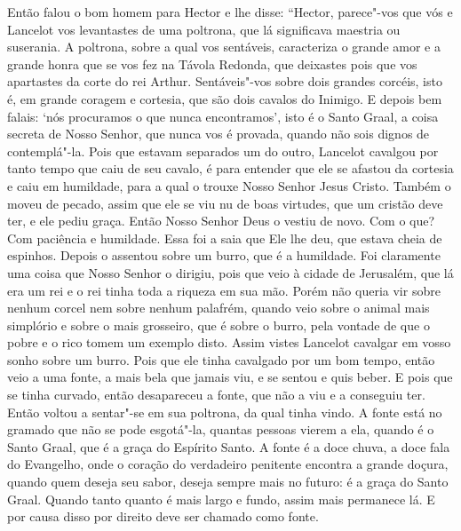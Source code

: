 Então falou o bom homem para Hector e lhe disse: “Hector, parece"-vos que vós e
Lancelot vos levantastes de uma poltrona, que lá significava maestria ou
suserania. A poltrona, sobre a qual vos sentáveis, caracteriza o grande amor e
a grande honra que se vos fez na Távola Redonda, que deixastes pois que vos
apartastes da corte do rei Arthur. Sentáveis"-vos sobre dois grandes corcéis,
isto é, em grande coragem e cortesia, que são dois cavalos do Inimigo. E depois
bem falais: ‘nós procuramos o que nunca encontramos’, isto é o Santo Graal, a
coisa secreta de Nosso Senhor, que nunca vos é provada, quando não sois dignos
de contemplá"-la. Pois que estavam separados um do outro, Lancelot cavalgou por
tanto tempo que caiu de seu cavalo, é para entender que ele se afastou da
cortesia e caiu em humildade, para a qual o trouxe Nosso Senhor Jesus Cristo.
Também o moveu de pecado, assim que ele se viu nu de boas virtudes, que um
cristão deve ter, e ele pediu graça. Então Nosso Senhor Deus o vestiu
de novo. Com o que? Com paciência e humildade. Essa foi a saia que Ele lhe deu,
que estava cheia de espinhos. Depois o assentou sobre um burro, que é a
humildade. Foi claramente uma coisa que Nosso Senhor o dirigiu, pois que veio à
cidade de Jerusalém, que lá era um rei e o rei tinha toda a riqueza em sua mão.
Porém não queria vir sobre nenhum corcel nem sobre nenhum palafrém, quando veio
sobre o animal mais simplório e sobre o mais grosseiro, que é sobre o burro,
pela vontade de que o pobre e o rico tomem um exemplo disto. Assim vistes
Lancelot cavalgar em vosso sonho sobre um burro. Pois que ele tinha cavalgado
por um bom tempo, então veio a uma fonte, a mais bela que jamais viu, e se
sentou e quis beber. E pois que se tinha curvado, então desapareceu a fonte,
que não a viu e a conseguiu ter. Então voltou a sentar"-se em sua poltrona, da
qual tinha vindo. A fonte está no gramado que não se pode esgotá"-la, quantas
pessoas vierem a ela, quando é o Santo Graal,  que é a graça do Espírito Santo.
A fonte é a doce chuva, a doce fala do Evangelho, onde o coração do verdadeiro
penitente encontra a grande doçura, quando quem deseja seu sabor, deseja sempre
mais no futuro: é a graça do Santo Graal. Quando tanto quanto é mais largo e
fundo, assim mais permanece lá. E por causa disso por direito deve ser chamado
como fonte.  

